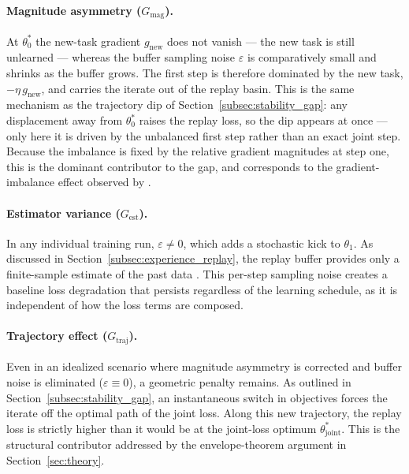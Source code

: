 \paragraph{Magnitude asymmetry ($G_{\text{mag}}$).} At $\theta_0^*$ the new-task gradient $g_{\text{new}}$ does not vanish --- the new task is still unlearned --- whereas the buffer sampling noise $\varepsilon$ is comparatively small and shrinks as the buffer grows. The first step is therefore dominated by the new task, $-\eta\, g_{\text{new}}$, and carries the iterate out of the replay basin. This is the same mechanism as the trajectory dip of Section~\ref{subsec:stability_gap}: any displacement away from $\theta_0^*$ raises the replay loss, so the dip appears at once --- only here it is driven by the unbalanced first step rather than an exact joint step. Because the imbalance is fixed by the relative gradient magnitudes at step one, this is the dominant contributor to the gap, and corresponds to the gradient-imbalance effect observed by \citet{delange2023continualevaluationlifelonglearning}.

\paragraph{Estimator variance ($G_{\text{est}}$).} In any individual training run, $\varepsilon \neq 0$, which adds a stochastic kick to $\theta_1$. As discussed in Section~\ref{subsec:experience_replay}, the replay buffer provides only a finite-sample estimate of the past data \cite{aljundi2019gradientbasedsampleselection}. This per-step sampling noise creates a baseline loss degradation that persists regardless of the learning schedule, as it is independent of how the loss terms are composed.

\paragraph{Trajectory effect ($G_{\text{traj}}$).} Even in an idealized scenario where magnitude asymmetry is corrected and buffer noise is eliminated ($\varepsilon \equiv 0$), a geometric penalty remains. As outlined in Section~\ref{subsec:stability_gap}, an instantaneous switch in objectives forces the iterate off the optimal path of the joint loss. Along this new trajectory, the replay loss is strictly higher than it would be at the joint-loss optimum $\theta_{\text{joint}}^*$. This is the structural contributor addressed by the envelope-theorem argument in Section~\ref{sec:theory}.

